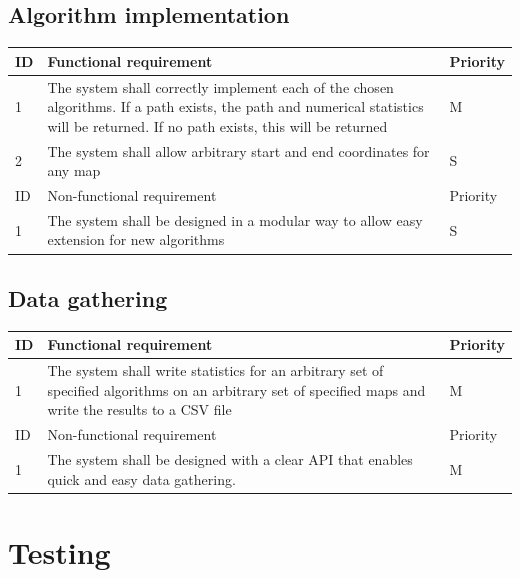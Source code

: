 \documentclass[12pt,notitlepage]{report}
\begin{document}
\subsection{Algorithm implementation}

\begin{center}
    \begin{tabular}{ l | p{10cm} | l}
    ID & Functional requirement & Priority  \\ \hline
    1 & The system shall correctly implement each of the chosen algorithms. If a path exists, the path and numerical statistics will be returned. If no path exists, this will be returned   & M \\ \hline
    2 & The system shall allow arbitrary start and end coordinates for any map & S \\ \hline
     \hline 
    ID & Non-functional requirement & Priority  \\ \hline
    1 & The system shall be designed in a modular way to allow easy extension for new algorithms & S \\
    \end{tabular}
\end{center}

\subsection{Data gathering}

\begin{center}
    \begin{tabular}{ l | p{10cm} | l}
    ID & Functional requirement & Priority  \\ \hline
    1 & The system shall write statistics for an arbitrary set of specified algorithms on an arbitrary set of specified maps and write the results to a CSV file & M \\ \hline
     \hline 
    ID & Non-functional requirement & Priority  \\ \hline
    1 & The system shall be designed with a clear API that enables quick and easy data gathering. & M \\
    \end{tabular}
\end{center}

\noindent
{}

\section {Testing}
\end{document}
